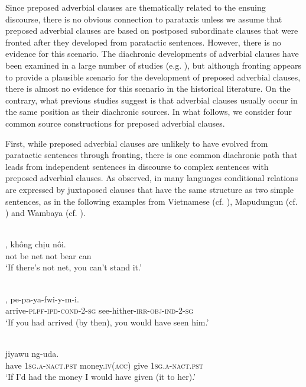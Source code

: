 \documentclass[output=paper]{langsci/langscibook}
\begin{document}
Since preposed adverbial clauses are thematically related to the ensuing discourse, there is no obvious connection to parataxis unless we assume that preposed adverbial clauses are based on postposed subordinate clauses that were fronted after they developed from paratactic sentences. However, there is no evidence for this scenario. The diachronic developments of adverbial clauses have been examined in a large number of studies (e.g. \citealt{Haiman1985,Haspelmath1989,Givón1991,Genetti1991,HarrisCampbell1995,Frajzyngier1996,DisterheftViti2010}), but although fronting appears to provide a plausible scenario for the development of preposed adverbial clauses, there is almost no evidence for this scenario in the historical literature. On the contrary, what previous studies suggest is that adverbial clauses usually occur in the same position as their diachronic sources. In what follows, we consider four common source constructions for preposed adverbial clauses.

First, while preposed adverbial clauses are unlikely to have evolved from paratactic sentences through fronting, there is one common diachronic path that leads from independent sentences in discourse to complex sentences with preposed adverbial clauses. As \citet[39--70]{Haiman1985} observed, in many languages conditional relations are expressed by juxtaposed clauses that have the same structure as two simple sentences, as in the following examples from Vietnamese (cf. ), Mapudungun (cf. ) and Wambaya (cf. ).

\ea\label{ex:diessel:3}
\\
,  không  chịu  nôi.\\
       not  be   net  not  bear  can\\
\glt   `If there’s not net, you can’t stand it.'
\z

\ea\label{ex:diessel:4}
\\
,    pe-pa-ya-fwi-y-m-i.\\
       arrive-\textsc{plpf}-\textsc{ipd}-\textsc{cond}-2-\textsc{sg}  see-hither-\textsc{irr}-\textsc{obj}-\textsc{ind}-2-\textsc{sg}\\
\glt   `If you had arrived (by then), you would have seen him.'
\z

\ea\label{ex:diessel:5}
\\
            jiyawu  ng-uda.\\
       have    \textsc{1sg}.\textsc{a-nact.pst}  money.\textsc{iv(acc)}  give  1\textsc{sg.a-nact.pst}\\
\glt   `If I’d had the money I would have given (it to her).'
\z
\end{document}
